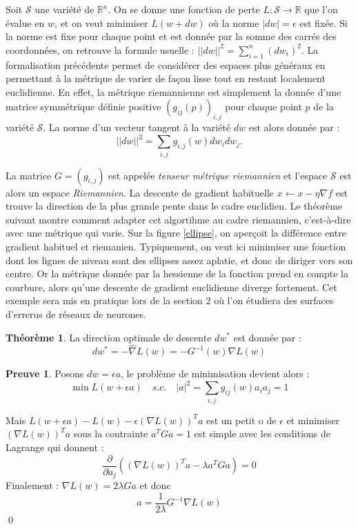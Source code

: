 \documentclass{article}
\theoremstyle{definition}
\newtheorem{thm}{Théorème}
\newtheorem{dem}{Preuve}
\newcommand{\R}{\mathbb R}
\begin{document}
\noindent Soit $\mathcal{S}$ une variété de $\R^n$. On se donne une fonction de perte $L : \mathcal S \rightarrow \R$ que l'on évalue en $w$, et on veut minimiser $L(w+dw)$ où la norme $|dw|=\epsilon$ est fixée. 
Si la norme est fixe pour chaque point et est donnée par la somme des carrés des coordonnées, on retrouve la formule usuelle :
$||dw||^2=\displaystyle \sum_{i=1}^n (dw_i)^2$. La formalisation précédente permet de considérer des espaces plus généraux en permettant à la métrique de varier de façon lisse tout en restant localement euclidienne. En effet, la métrique riemannienne est simplement la donnée d'une matrice symmétrique définie positive $(g_{ij}(p))_{i,j}$ pour chaque point $p$ de la variété $\mathcal{S}$. 
La norme d'un vecteur tangent à la variété $dw$ est alors donnée par :
\[||dw||^2=\displaystyle \sum_{i,j} g_{i,j}(w) dw_i dw_j.\]

 La matrice $G=(g_{i,j})$ est appelée \textit{tenseur métrique riemannien } et l'espace $\mathcal{S}$ est alors un espace \textit{Riemannien}. La descente de gradient habituelle $x \leftarrow x-\eta \nabla f$ est  trouve la direction de la plus grande pente dans le cadre euclidien. Le théorème suivant montre comment adapter cet algortihme au cadre riemannien, c'est-à-dire avec une métrique qui varie. Sur la figure \ref{ellipse}, on aperçoit la différence entre gradient habituel et riemanien. Typiquement, on veut ici minimiser une fonction dont les lignes de niveau sont des ellipses assez aplatie, et donc de diriger vers son centre. Or la métrique donnée par la hessienne de la fonction prend en compte la courbure, alors qu'une descente de gradient euclidienne diverge fortement. Cet exemple sera mis en pratique lors de la section $2$ où l'on étudiera des surfaces d'errerus de réseaux de neurones.\\


\begin{thm}
La direction optimale de descente $dw^*$ est donnée par :
\[dw^*= -\hat{\nabla}L(w)=-G^{-1}(w) \nabla L(w)\]
\end{thm}

\begin{dem} Posons $dw= \epsilon a $, le problème de minimisation devient alors :
\[\min L(w+\epsilon a) \quad s.c. \quad |a|^2=\sum_{i,j} g_{ij}(w)a_i a_j=1\]

Mais $L(w+\epsilon a) - L(w)-\epsilon (\nabla L(w))^T a $ est un petit o de $\epsilon$ et minimiser $(\nabla L(w))^T a$ sous la contrainte $a^T G a = 1$ est simple avec les conditions de Lagrange qui donnent :
\[\frac{\partial}{\partial a_j}((\nabla L(w))^T a - \lambda a^T G a )=0\]
Finalement : $\nabla L(w) = 2\lambda Ga$ et donc 
\[a=\frac{1}{2\lambda}G^{-1}\nabla L(w)\] \qed
\end{dem}
\end{document}
